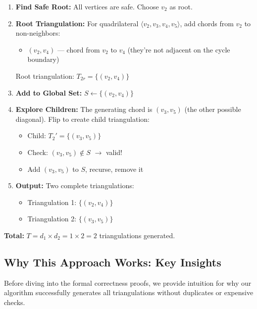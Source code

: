 \documentclass[12pt,a4paper]{article}
\theoremstyle{definition}
\theoremstyle{remark}
\begin{document}
\begin{enumerate}
    \item \textbf{Find Safe Root:} All vertices are safe. Choose $v_2$ as root.
    
    \item \textbf{Root Triangulation:} For quadrilateral $\langle v_2, v_3, v_4, v_5 \rangle$, add chords from $v_2$ to non-neighbors:
    \begin{itemize}
        \item $(v_2, v_4)$ --- chord from $v_2$ to $v_4$ (they're not adjacent on the cycle boundary)
    \end{itemize}
    Root triangulation: $T_{2r} = \{(v_2, v_4)\}$
    
    \item \textbf{Add to Global Set:} $S \gets \{(v_2, v_4)\}$
    
    \item \textbf{Explore Children:} The generating chord is $(v_3, v_5)$ (the other possible diagonal). Flip to create child triangulation:
    \begin{itemize}
        \item Child: $T_{2}' = \{(v_3, v_5)\}$
        \item Check: $(v_3, v_5) \notin S$ $\to$ valid!
        \item Add $(v_3, v_5)$ to $S$, recurse, remove it
    \end{itemize}
    
    \item \textbf{Output:} Two complete triangulations:
    \begin{itemize}
        \item Triangulation 1: $\{(v_2, v_4)\}$
        \item Triangulation 2: $\{(v_3, v_5)\}$
    \end{itemize}
\end{enumerate}

\textbf{Total:} $T = d_1 \times d_2 = 1 \times 2 = 2$ triangulations generated.

\subsection{Why This Approach Works: Key Insights}
\label{sec:why_it_works}

Before diving into the formal correctness proofs, we provide intuition for why our algorithm successfully generates all triangulations without duplicates or expensive checks.
\end{document}
